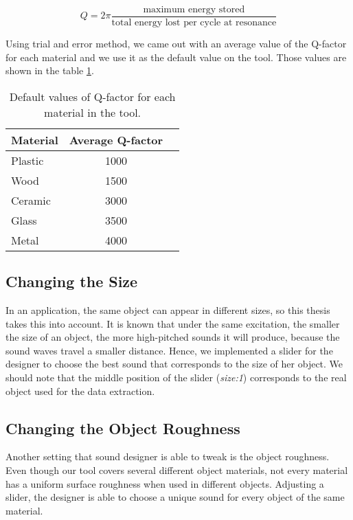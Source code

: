 \begin{equation}\label{eq:Qfactor}
Q=2\pi \frac{\mbox{maximum energy stored}}{\mbox{total energy lost per cycle at resonance}}
\end{equation}

Using trial and error method, we came out with an average value of the Q-factor for each material and we use it as the default value on the tool. Those values are shown in the table \ref{tab:default_Q}.

\begin{table}[H]
	\centering
    \begin{tabular}{ | l | c | p{5cm} |}
    \hline
    \textbf{Material} & \textbf{Average Q-factor} \\ \hline
    Plastic & 1000 \\ \hline
    Wood & 1500 \\ \hline
    Ceramic & 3000 \\ \hline
    Glass & 3500 \\ \hline
    Metal & 4000 \\
    \hline
    \end{tabular}
    \caption{Default values of Q-factor for each material in the tool.}
    \label{tab:default_Q}
\end{table} 

\subsection{Changing the Size}
In an application, the same object can appear in different sizes, so this thesis takes this into account. It is known that under the same excitation, the smaller the size of an object, the more high-pitched sounds it will produce, because the sound waves travel a smaller distance. Hence, we implemented a slider for the designer to choose the best sound that corresponds to the size of her object. We should note that the middle position of the slider (\textit{size:1}) corresponds to the real object used for the data extraction.

\subsection{Changing the Object Roughness}
Another setting that sound designer is able to tweak is the object roughness. Even though our tool covers several different object materials, not every material has a uniform surface roughness when used in different objects. Adjusting a slider, the designer is able to choose a unique sound for every object of the same material. 


